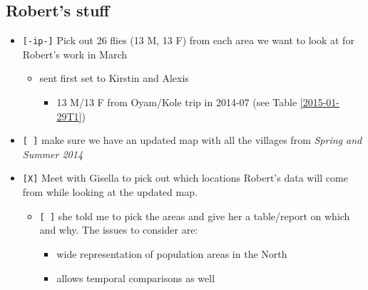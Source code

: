 \documentclass[letterpaper]{scrartcl}
\begin{document}
\subsection{Robert's stuff}\label{roberts-stuff}

\begin{itemize}
\itemsep1pt\parskip0pt
\item
  \texttt{{[}-ip-{]}} Pick out 26 flies (13 M, 13 F) from each area we
  want to look at for Robert's work in March

  \begin{itemize}
  \itemsep1pt\parskip0pt
  \item
    sent first set to Kirstin and Alexis

    \begin{itemize}
    \itemsep1pt\parskip0pt
    \item
      13 M/13 F from Oyam/Kole trip in 2014-07 (see Table
      \ref{2015-01-29T1})
    \end{itemize}
  \end{itemize}
\item
  \texttt{{[} {]}} make sure we have an updated map with all the
  villages from \emph{Spring and Summer 2014}
\item
  \texttt{{[}X{]}} Meet with Gisella to pick out which locations
  Robert's data will come from while looking at the updated map.

  \begin{itemize}
  \itemsep1pt\parskip0pt
  \item
    \texttt{{[} {]}} she told me to pick the areas and give her a
    table/report on which and why. The issues to consider are:

    \begin{itemize}
    \itemsep1pt\parskip0pt
    \item
      wide representation of population areas in the North
    \item
      allows temporal comparisons as well
    \end{itemize}
  \end{itemize}
\end{itemize}
\end{document}
